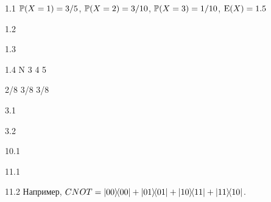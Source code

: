 \protect \hypertarget {soln:1.1}{}
\begin{solution}{{1.1}}
  $\P(X=1)=3/5$, $\P(X=2)=3/10$, $\P(X=3)=1/10$, $\E(X)=1.5$
\end{solution}
\protect \hypertarget {soln:1.2}{}
\begin{solution}{{1.2}}
\end{solution}
\protect \hypertarget {soln:1.3}{}
\begin{solution}{{1.3}}
\end{solution}
\protect \hypertarget {soln:1.4}{}
\begin{solution}{{1.4}}
   N 3 4 5

  2/8 3/8 3/8
\end{solution}
\protect \hypertarget {soln:2.1}{}
\protect \hypertarget {soln:2.2}{}
\protect \hypertarget {soln:2.3}{}
\protect \hypertarget {soln:2.4}{}
\protect \hypertarget {soln:3.1}{}
\begin{solution}{{3.1}}
\end{solution}
\protect \hypertarget {soln:3.2}{}
\begin{solution}{{3.2}}
\end{solution}
\protect \hypertarget {soln:10.1}{}
\begin{solution}{{10.1}}
  
\end{solution}
\protect \hypertarget {soln:11.1}{}
\begin{solution}{{11.1}}
  
\end{solution}
\protect \hypertarget {soln:11.2}{}
\begin{solution}{{11.2}}
  Например, $CNOT = \ketbra{00}{00} + \ketbra{01}{01} + \ketbra{10}{11} + \ketbra{11}{10}$.
\end{solution}
